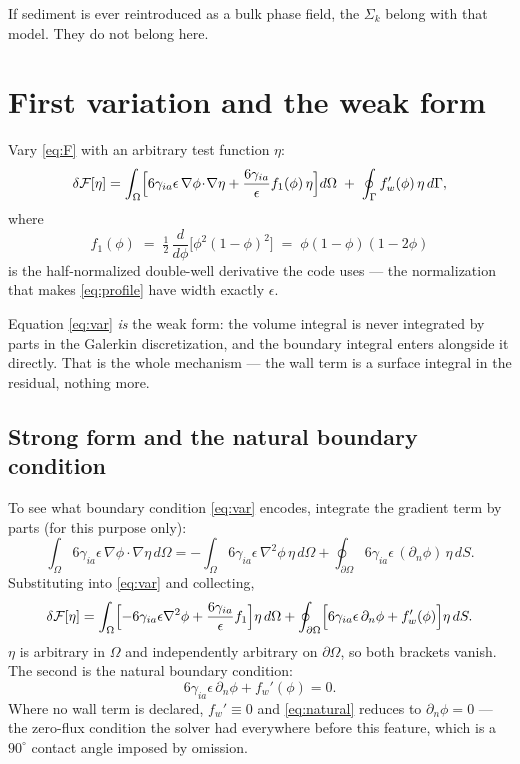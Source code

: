 \documentclass[11pt,a4paper]{article}
\newcommand{\sia}{\gamma_{ia}}
\newcommand{\eps}{\epsilon}
\newcommand{\dn}{\partial_n}
\begin{document}
If sediment is ever reintroduced as a bulk phase field, the $\Sigma_k$ belong
with that model. They do not belong here.

\section{First variation and the weak form}

Vary \eqref{eq:F} with an arbitrary test function $\eta$:
\begin{equation}
\delta\mathcal{F}[\eta]
=\int_\Omega\Bigl[6\sia\eps\,\nabla\phi\!\cdot\!\nabla\eta
+\frac{6\sia}{\eps}f_1(\phi)\,\eta\Bigr]d\Omega
\;+\;\oint_\Gamma f_w'(\phi)\,\eta\,d\Gamma ,
\label{eq:var}
\end{equation}
where
\begin{equation}
f_1(\phi)\;=\;\tfrac12\,\frac{d}{d\phi}\bigl[\phi^{2}(1-\phi)^{2}\bigr]
\;=\;\phi(1-\phi)(1-2\phi)
\end{equation}
is the half-normalized double-well derivative the code uses --- the
normalization that makes \eqref{eq:profile} have width exactly $\eps$.

Equation \eqref{eq:var} \emph{is} the weak form: the volume integral is never
integrated by parts in the Galerkin discretization, and the boundary integral
enters alongside it directly. That is the whole mechanism --- the wall term is a
surface integral in the residual, nothing more.

\subsection{Strong form and the natural boundary condition}\label{sec:bc}

To see what boundary condition \eqref{eq:var} encodes, integrate the gradient
term by parts (for this purpose only):
\begin{equation}
\int_\Omega 6\sia\eps\,\nabla\phi\!\cdot\!\nabla\eta\,d\Omega
=-\int_\Omega 6\sia\eps\,\nabla^{2}\phi\,\eta\,d\Omega
+\oint_{\partial\Omega}6\sia\eps\,(\dn\phi)\,\eta\,dS .
\end{equation}
Substituting into \eqref{eq:var} and collecting,
\begin{equation}
\delta\mathcal{F}[\eta]
=\int_\Omega\Bigl[-6\sia\eps\nabla^{2}\phi+\frac{6\sia}{\eps}f_1\Bigr]\eta\,d\Omega
+\oint_{\partial\Omega}\Bigl[6\sia\eps\,\dn\phi+f_w'(\phi)\Bigr]\eta\,dS .
\end{equation}
$\eta$ is arbitrary in $\Omega$ and independently arbitrary on $\partial\Omega$,
so both brackets vanish. The second is the natural boundary condition:
\begin{equation}
6\sia\eps\,\dn\phi + f_w'(\phi) = 0 .
\label{eq:natural}
\end{equation}
Where no wall term is declared, $f_w'\equiv0$ and \eqref{eq:natural} reduces to
$\dn\phi=0$ --- the zero-flux condition the solver had everywhere before this
feature, which is a $90^\circ$ contact angle imposed by omission.
\end{document}
